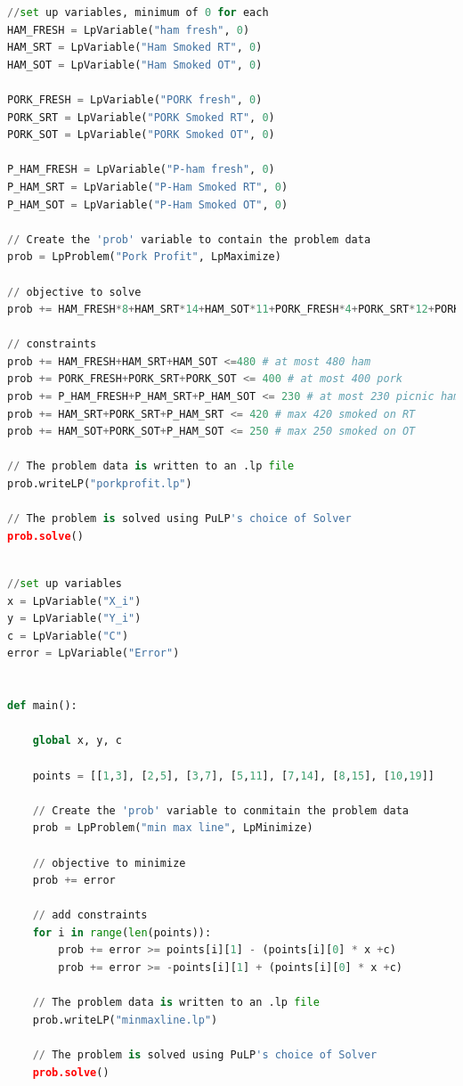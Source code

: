 \documentclass[11pt,letterpaper]{article}
\begin{document}
\begin{lstlisting}[language=python,caption={Code to solve linear program},mathescape]
//set up variables, minimum of 0 for each
HAM_FRESH = LpVariable("ham fresh", 0)
HAM_SRT = LpVariable("Ham Smoked RT", 0)
HAM_SOT = LpVariable("Ham Smoked OT", 0)

PORK_FRESH = LpVariable("PORK fresh", 0)
PORK_SRT = LpVariable("PORK Smoked RT", 0)
PORK_SOT = LpVariable("PORK Smoked OT", 0)

P_HAM_FRESH = LpVariable("P-ham fresh", 0)
P_HAM_SRT = LpVariable("P-Ham Smoked RT", 0)
P_HAM_SOT = LpVariable("P-Ham Smoked OT", 0)

// Create the 'prob' variable to contain the problem data
prob = LpProblem("Pork Profit", LpMaximize)

// objective to solve
prob += HAM_FRESH*8+HAM_SRT*14+HAM_SOT*11+PORK_FRESH*4+PORK_SRT*12+PORK_SOT*7+P_HAM_FRESH*4+P_HAM_SRT*13+P_HAM_SOT*9

// constraints
prob += HAM_FRESH+HAM_SRT+HAM_SOT <=480 # at most 480 ham
prob += PORK_FRESH+PORK_SRT+PORK_SOT <= 400 # at most 400 pork
prob += P_HAM_FRESH+P_HAM_SRT+P_HAM_SOT <= 230 # at most 230 picnic ham
prob += HAM_SRT+PORK_SRT+P_HAM_SRT <= 420 # max 420 smoked on RT
prob += HAM_SOT+PORK_SOT+P_HAM_SOT <= 250 # max 250 smoked on OT

// The problem data is written to an .lp file
prob.writeLP("porkprofit.lp")

// The problem is solved using PuLP's choice of Solver
prob.solve()

\end{lstlisting}

\begin{lstlisting}[language=python,caption={Code to solve linear program},mathescape]

//set up variables
x = LpVariable("X_i")
y = LpVariable("Y_i")
c = LpVariable("C")
error = LpVariable("Error")


def main():

	global x, y, c

	points = [[1,3], [2,5], [3,7], [5,11], [7,14], [8,15], [10,19]]

	// Create the 'prob' variable to conmitain the problem data
	prob = LpProblem("min max line", LpMinimize)

	// objective to minimize
	prob += error

	// add constraints
	for i in range(len(points)):
		prob += error >= points[i][1] - (points[i][0] * x +c)
		prob += error >= -points[i][1] + (points[i][0] * x +c)
	
	// The problem data is written to an .lp file
	prob.writeLP("minmaxline.lp")

	// The problem is solved using PuLP's choice of Solver
	prob.solve()
	

\end{lstlisting}
\end{document}
